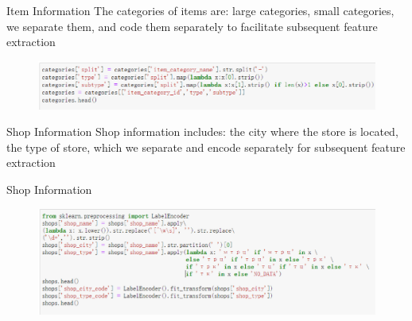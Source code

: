\documentclass[
 size=14pt,
 paper=smartboard,  %
 mode=present, 		%
 display=slides, 	%
 style=tuliplab,  	%
 pauseslide,
 fleqn,leqno]{powerdot}
\begin{document}
\begin{slide}[toc=,bm=]{Item Information}
  The categories of items are: large categories, small categories, we separate them, and code them separately to facilitate subsequent feature extraction
  \begin{figure}
    \includegraphics[scale=0.5]{picture/data_13.eps}
  \end{figure}
\end{slide}



\begin{slide}[toc=,bm=]{Shop Information}
  Shop information includes: the city where the store is located, the type of store, which we separate and encode separately for subsequent feature extraction
\end{slide}





\begin{slide}[toc=,bm=]{Shop Information}
  \begin{figure}
    \includegraphics[scale=0.5]{picture/data_12.eps}
  \end{figure}
\end{slide}
\end{document}
